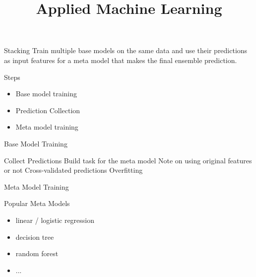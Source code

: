 \documentclass[11pt,compress,t,notes=noshow, aspectratio=169, xcolor=table]{beamer}
\title{Applied Machine Learning}
\date{}
\begin{document}


\begin{vbframe}{Stacking}
Train multiple base models on the same data and use their predictions as input features for a meta model that makes the final ensemble prediction.
\end{vbframe}


\begin{vbframe}{Steps}

\begin{itemize}
\item Base model training
\item Prediction Collection
\item Meta model training
\end{itemize}
\end{vbframe}


\begin{vbframe}{Base Model Training}
\end{vbframe}


\begin{vbframe}{Collect Predictions}
Build task for the meta model
Note on using original features or not
Cross-validated predictions
Overfitting
\end{vbframe}


\begin{vbframe}{Meta Model Training}
\end{vbframe}


\begin{vbframe}{Popular Meta Models}
  \begin{itemize}
    \item linear / logistic regression
    \item decision tree
    \item random forest
    \item ...
  \end{itemize}
\end{vbframe}
\end{document}
